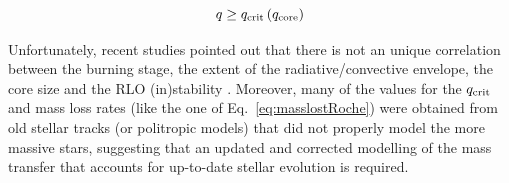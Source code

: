 \documentclass[a4paper,titlepage]{book}     	%
\begin{document}
\begin{equation}\label{eq:qcrit}
	q \geq q_\textup{crit} \left(q_\textup{core}\right)
\end{equation}

Unfortunately, recent studies pointed out that there is not an unique correlation between the burning stage, the extent of the radiative/convective envelope, the core size and the RLO (in)stability \cite{klencki2020_mtproblems}. Moreover, many of the values for the $q_{\rm crit}$ and mass loss rates (like the one of Eq.\ \ref{eq:masslostRoche}) were obtained from old stellar tracks (or politropic models) that did not properly model the more massive stars, suggesting that an updated and corrected modelling of the mass transfer that accounts for up-to-date stellar evolution is required.
\end{document}
